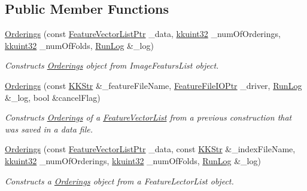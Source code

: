 \subsection*{Public Member Functions}
\begin{DoxyCompactItemize}
\item 
\hyperlink{class_k_k_m_l_l_1_1_orderings_ae96f4cb54869e0e444aa9e784a97f32d}{Orderings} (const \hyperlink{namespace_k_k_m_l_l_acf2ba92a3cf03e2b19674b24ff488ef6}{Feature\+Vector\+List\+Ptr} \+\_\+data, \hyperlink{namespace_k_k_b_af8d832f05c54994a1cce25bd5743e19a}{kkuint32} \+\_\+num\+Of\+Orderings, \hyperlink{namespace_k_k_b_af8d832f05c54994a1cce25bd5743e19a}{kkuint32} \+\_\+num\+Of\+Folds, \hyperlink{class_k_k_b_1_1_run_log}{Run\+Log} \&\+\_\+log)
\begin{DoxyCompactList}\small\item\em Constructs \hyperlink{class_k_k_m_l_l_1_1_orderings}{Orderings} object from Image\+Featurs\+List object. \end{DoxyCompactList}\item 
\hyperlink{class_k_k_m_l_l_1_1_orderings_ae336f8b350f2eeb9b736a1d73cf341cd}{Orderings} (const \hyperlink{class_k_k_b_1_1_k_k_str}{K\+K\+Str} \&\+\_\+feature\+File\+Name, \hyperlink{namespace_k_k_m_l_l_aa005d92db87866fad489feb5ff4b2dfa}{Feature\+File\+I\+O\+Ptr} \+\_\+driver, \hyperlink{class_k_k_b_1_1_run_log}{Run\+Log} \&\+\_\+log, bool \&cancel\+Flag)
\begin{DoxyCompactList}\small\item\em Constructs \hyperlink{class_k_k_m_l_l_1_1_orderings}{Orderings} of a \hyperlink{class_k_k_m_l_l_1_1_feature_vector_list}{Feature\+Vector\+List} from a previous construction that was saved in a data file. \end{DoxyCompactList}\item 
\hyperlink{class_k_k_m_l_l_1_1_orderings_adb73476f71517490aaa1dd7820daedfd}{Orderings} (const \hyperlink{namespace_k_k_m_l_l_acf2ba92a3cf03e2b19674b24ff488ef6}{Feature\+Vector\+List\+Ptr} \+\_\+data, const \hyperlink{class_k_k_b_1_1_k_k_str}{K\+K\+Str} \&\+\_\+index\+File\+Name, \hyperlink{namespace_k_k_b_af8d832f05c54994a1cce25bd5743e19a}{kkuint32} \+\_\+num\+Of\+Orderings, \hyperlink{namespace_k_k_b_af8d832f05c54994a1cce25bd5743e19a}{kkuint32} \+\_\+num\+Of\+Folds, \hyperlink{class_k_k_b_1_1_run_log}{Run\+Log} \&\+\_\+log)
\begin{DoxyCompactList}\small\item\em Constructs a \hyperlink{class_k_k_m_l_l_1_1_orderings}{Orderings} object from a Feature\+Lector\+List object. \end{DoxyCompactList}\item 

\end{DoxyCompactItemize}
